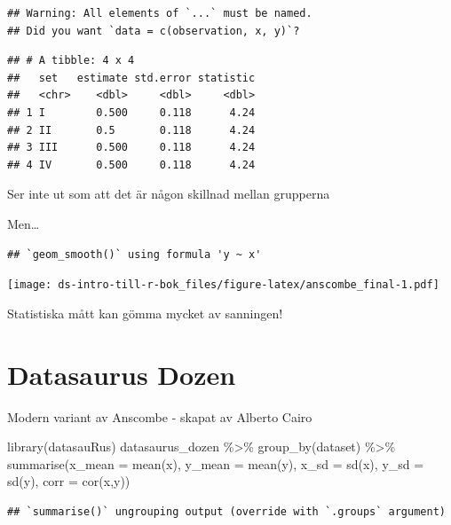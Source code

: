 \documentclass[
]{book}
\newenvironment{Shaded}{\begin{snugshade}}{\end{snugshade}}
\newcommand{\AttributeTok}[1]{\textcolor[rgb]{0.77,0.63,0.00}{#1}}
\newcommand{\FunctionTok}[1]{\textcolor[rgb]{0.00,0.00,0.00}{#1}}
\newcommand{\NormalTok}[1]{#1}
\newcommand{\SpecialCharTok}[1]{\textcolor[rgb]{0.00,0.00,0.00}{#1}}
\begin{document}
\begin{verbatim}
## Warning: All elements of `...` must be named.
## Did you want `data = c(observation, x, y)`?
\end{verbatim}

\begin{verbatim}
## # A tibble: 4 x 4
##   set   estimate std.error statistic
##   <chr>    <dbl>     <dbl>     <dbl>
## 1 I        0.500     0.118      4.24
## 2 II       0.5       0.118      4.24
## 3 III      0.500     0.118      4.24
## 4 IV       0.500     0.118      4.24
\end{verbatim}

Ser inte ut som att det är någon skillnad mellan grupperna

Men\ldots{}

\begin{verbatim}
## `geom_smooth()` using formula 'y ~ x'
\end{verbatim}

\texttt{[image: ds-intro-till-r-bok\_files/figure-latex/anscombe\_final-1.pdf]}

Statistiska mått kan gömma mycket av sanningen!

\hypertarget{datasaurus-dozen}{%
\section{Datasaurus Dozen}\label{datasaurus-dozen}}

Modern variant av Anscombe - skapat av Alberto Cairo

\begin{Shaded}
\begin{Highlighting}[]
\FunctionTok{library}\NormalTok{(datasauRus)}
\NormalTok{datasaurus\_dozen }\SpecialCharTok{\%\textgreater{}\%} 
  \FunctionTok{group\_by}\NormalTok{(dataset) }\SpecialCharTok{\%\textgreater{}\%}
  \FunctionTok{summarise}\NormalTok{(}\AttributeTok{x\_mean =} \FunctionTok{mean}\NormalTok{(x), }\AttributeTok{y\_mean =} \FunctionTok{mean}\NormalTok{(y), }
            \AttributeTok{x\_sd =} \FunctionTok{sd}\NormalTok{(x), }\AttributeTok{y\_sd =} \FunctionTok{sd}\NormalTok{(y),}
            \AttributeTok{corr =} \FunctionTok{cor}\NormalTok{(x,y)) }
\end{Highlighting}
\end{Shaded}

\begin{verbatim}
## `summarise()` ungrouping output (override with `.groups` argument)
\end{verbatim}
\end{document}
